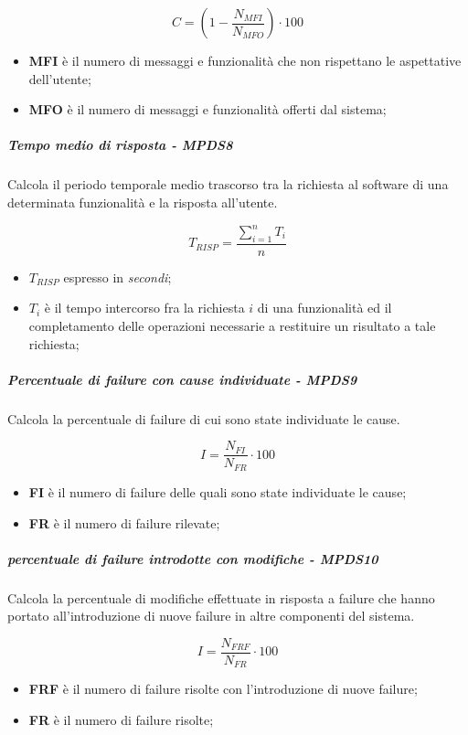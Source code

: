 \begin{equation*}C=(1-\frac{N_{MFI}}{N_{MFO}}) \cdot 100\end{equation*}
\begin{itemize}
	\item \textbf{MFI} è il numero di messaggi e funzionalità che non rispettano le aspettative dell'utente;
	\item \textbf{MFO} è il numero di messaggi e funzionalità offerti dal sistema;
\end{itemize}
\subparagraph{Tempo medio di risposta - MPDS8}
Calcola il periodo temporale medio trascorso tra la richiesta al software di una determinata funzionalità e la risposta all’utente.

\begin{equation*}T_{RISP} = \frac{\sum_{i=1}^{n} T_{i}}{n}\end{equation*}
\begin{itemize}
	\item \textbf{$T_{RISP}$} espresso in \textit{secondi};
	\item \textbf{$T_{i}$} è il tempo intercorso fra la richiesta $i$ di una funzionalità ed il completamento delle operazioni necessarie a restituire un risultato a tale richiesta;
\end{itemize}
\subparagraph{Percentuale di failure con cause individuate - MPDS9}
Calcola la percentuale di failure di cui sono state individuate le cause.

\begin{equation*}I=\frac{N_{FI}}{N_{FR}} \cdot 100 \end{equation*}
\begin{itemize}
	\item \textbf{FI}  è il numero di failure delle quali sono state individuate le cause;
	\item \textbf{FR} è il numero di failure rilevate;
\end{itemize}
\subparagraph{percentuale di failure introdotte con modifiche - MPDS10}
Calcola la percentuale di modifiche effettuate in risposta a failure che hanno portato all'introduzione di nuove failure in altre componenti del sistema.

\begin{equation*}I=\frac{N_{FRF}}{N_{FR}} \cdot 100 \end{equation*}
\begin{itemize}
	\item \textbf{FRF}  è il numero di failure risolte con l'introduzione di nuove failure;
	\item \textbf{FR} è il numero di failure risolte;
\end{itemize}

